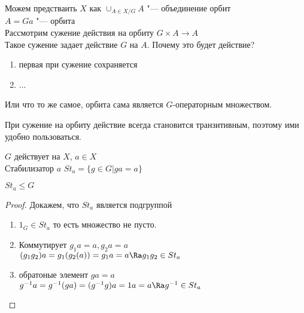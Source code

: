 Можем предстваить $X$ как
$\cup_{A \in X/G} A$ "--- объединение орбит\\
$A = Ga$ "--- орбита\\

Рассмотрим сужение действия на орбиту
$G \times A \to A$\\

Такое сужение задает действие $G$ на $A$. Почему это будет действие? 
\begin{enumerate}
\item первая при сужение сохраняется
\item ...
\end{enumerate}

Или что то же самое, орбита сама является $G$-операторным множеством.

При сужение на орбиту действие всегда становится транзитивным, поэтому ими удобно пользоваться.

\begin{Def}
$G$ действует на $X$, $a \in X$\\
Стабилизатор $a$ $St_{a} = \{g \in G | ga = a\}$  \\

\end{Def}
\begin{lemma}
$St_a \le G$
\end{lemma}
\begin{proof}
Докажем, что $St_a$ является подгруппой 
\begin{enumerate}
\item 
$1_G \in St_a$ то есть множество не пусто.
\item 
Коммутирует
$g_1a = a, g_2a = a$\\
$(g_1g_2)a = g_1(g_2(a)) = g_1a = a \Ra g_1g_2 \in St_a$ \\
\item 
обратоные элемент
$ga = a$\\
$g^{-1}a = g^{-1}(ga) = (g^{-1}g)a = 1a = a \Ra g^{-1} \in St_a$\\
\end{enumerate}
\end{proof}

